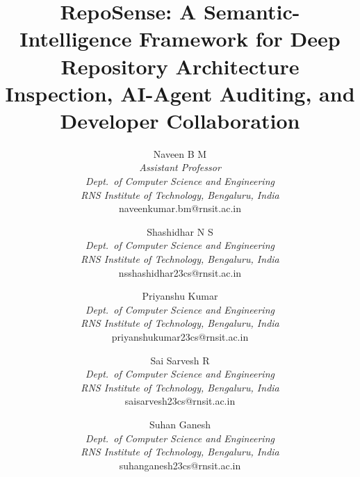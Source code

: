 \documentclass[journal]{IEEEtran}
\begin{document}
\title{RepoSense: A Semantic-Intelligence Framework for Deep Repository Architecture Inspection, AI-Agent Auditing, and Developer Collaboration}

\author{%
    \begin{tabular}{c}
        Naveen B M\\
        \textit{Assistant Professor}\\
        \textit{Dept.\ of Computer Science and Engineering}\\
        \textit{RNS Institute of Technology, Bengaluru, India}\\
        naveenkumar.bm@rnsit.ac.in
    \end{tabular}
    \and
    \begin{tabular}{c}
        Shashidhar N S\\
        \textit{Dept.\ of Computer Science and Engineering}\\
        \textit{RNS Institute of Technology, Bengaluru, India}\\
        nsshashidhar23cs@rnsit.ac.in
    \end{tabular}
    \and
    \begin{tabular}{c}
        Priyanshu Kumar\\
        \textit{Dept.\ of Computer Science and Engineering}\\
        \textit{RNS Institute of Technology, Bengaluru, India}\\
        priyanshukumar23cs@rnsit.ac.in
    \end{tabular}
    \and
    \begin{tabular}{c}
        Sai Sarvesh R\\
        \textit{Dept.\ of Computer Science and Engineering}\\
        \textit{RNS Institute of Technology, Bengaluru, India}\\
        saisarvesh23cs@rnsit.ac.in
    \end{tabular}
    \and
    \begin{tabular}{c}
        Suhan Ganesh\\
        \textit{Dept.\ of Computer Science and Engineering}\\
        \textit{RNS Institute of Technology, Bengaluru, India}\\
        suhanganesh23cs@rnsit.ac.in
    \end{tabular}
}

\maketitle
\end{document}
